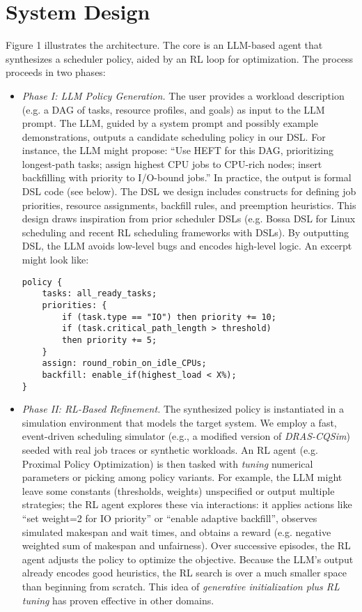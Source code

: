 \section{\sys{} System Design}

Figure 1 illustrates the \sys{} architecture. The core is an LLM-based agent that synthesizes a scheduler policy, aided by an RL loop for optimization. The process proceeds in two phases:

\begin{itemize}
\item \emph{Phase I: LLM Policy Generation.} The user provides a workload description (e.g. a DAG of tasks, resource profiles, and goals) as input to the LLM prompt. The LLM, guided by a system prompt and possibly example demonstrations, outputs a candidate scheduling policy in our DSL. For instance, the LLM might propose: ``Use HEFT for this DAG, prioritizing longest-path tasks; assign highest CPU jobs to CPU-rich nodes; insert backfilling with priority to I/O-bound jobs.'' In practice, the output is formal DSL code (see below). The DSL we design includes constructs for defining job priorities, resource assignments, backfill rules, and preemption heuristics. This design draws inspiration from prior scheduler DSLs (e.g. Bossa DSL for Linux scheduling and recent RL scheduling frameworks with DSLs). By outputting DSL, the LLM avoids low-level bugs and encodes high-level logic. An excerpt might look like:

\begin{verbatim}
policy {
    tasks: all_ready_tasks;
    priorities: {
        if (task.type == "IO") then priority += 10;
        if (task.critical_path_length > threshold) 
        then priority += 5;
    }
    assign: round_robin_on_idle_CPUs;
    backfill: enable_if(highest_load < X%);
}
\end{verbatim}

\item \emph{Phase II: RL-Based Refinement.} The synthesized policy is instantiated in a simulation environment that models the target system. We employ a fast, event-driven scheduling simulator (e.g., a modified version of \emph{DRAS-CQSim}) seeded with real job traces or synthetic workloads. An RL agent (e.g. Proximal Policy Optimization) is then tasked with \emph{tuning} numerical parameters or picking among policy variants. For example, the LLM might leave some constants (thresholds, weights) unspecified or output multiple strategies; the RL agent explores these via interactions: it applies actions like ``set weight=2 for IO priority'' or ``enable adaptive backfill'', observes simulated makespan and wait times, and obtains a reward (e.g. negative weighted sum of makespan and unfairness). Over successive episodes, the RL agent adjusts the policy to optimize the objective. Because the LLM's output already encodes good heuristics, the RL search is over a much smaller space than beginning from scratch. This idea of \emph{generative initialization plus RL tuning} has proven effective in other domains.
\end{itemize}

